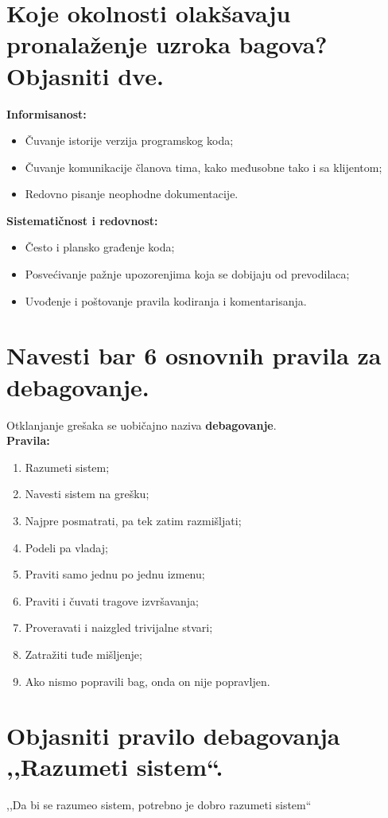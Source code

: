 \documentclass[a4paper]{article}
\begin{document}
\section{Koje okolnosti olakšavaju pronalaženje uzroka bagova? Objasniti dve.}
  \noindent \textbf{Informisanost:}
  \begin{itemize}
    \item Čuvanje istorije verzija programskog koda;
    \item Čuvanje komunikacije članova tima, kako međusobne tako i sa klijentom;
    \item Redovno pisanje neophodne dokumentacije.
  \end{itemize}
  \textbf{Sistematičnost i redovnost:}
  \begin{itemize}
    \item Često i plansko građenje koda;
    \item Posvećivanje pažnje upozorenjima koja se dobijaju od prevodilaca;
    \item Uvođenje i poštovanje pravila kodiranja i komentarisanja.
  \end{itemize}

\section{Navesti bar 6 osnovnih pravila za debagovanje.}
  Otklanjanje grešaka se uobičajno naziva \textbf{debagovanje}.\\
  \textbf{Pravila:}
  \begin{enumerate}
    \item Razumeti sistem;
    \item Navesti sistem na grešku;
    \item Najpre posmatrati, pa tek zatim razmišljati;
    \item Podeli pa vladaj;
    \item Praviti samo jednu po jednu izmenu;
    \item Praviti i čuvati tragove izvršavanja;
    \item Proveravati i naizgled trivijalne stvari;
    \item Zatražiti tuđe mišljenje;
    \item Ako nismo popravili bag, onda on nije popravljen.
  \end{enumerate}

\section{Objasniti pravilo debagovanja ,,Razumeti sistem``.}
  ,,Da bi se razumeo sistem, potrebno je dobro razumeti sistem``\\
\end{document}
